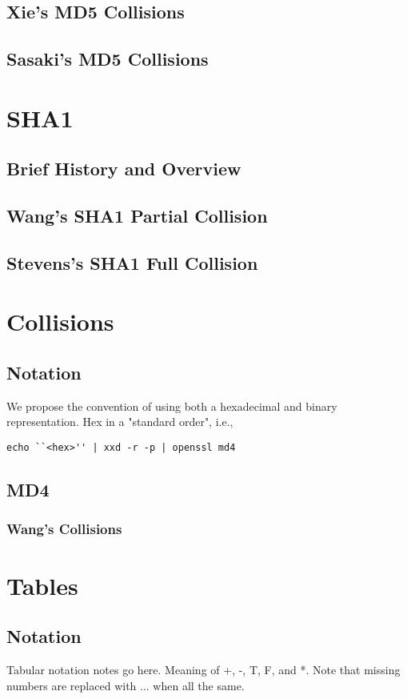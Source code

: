 \documentclass[letterpaper,twocolumn,10pt]{article}
\begin{document}
\subsection{Xie's MD5 Collisions}
\subsection{Sasaki's MD5 Collisions}

\section{SHA1}
\subsection{Brief History and Overview}
\subsection{Wang's SHA1 Partial Collision}
\subsection{Stevens's SHA1 Full Collision}

\newpage
\section{Collisions}
\subsection{Notation}
We propose the convention of using both a hexadecimal and binary representation.
Hex in a "standard order", i.e.,
\begin{lstlisting}
echo ``<hex>'' | xxd -r -p | openssl md4
\end{lstlisting}

\subsection{MD4}
\subsubsection{Wang's Collisions}

\newpage
\section{Tables}
\subsection{Notation}
Tabular notation notes go here.
Meaning of +, -, T, F, and *.
Note that missing numbers are replaced
with ... when all the same.
\end{document}
